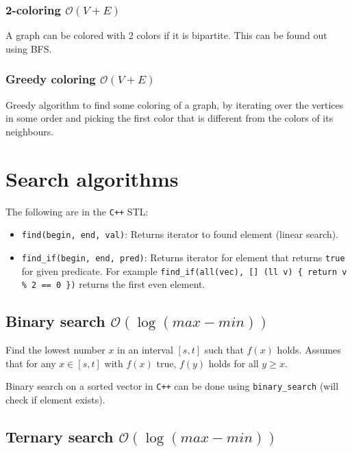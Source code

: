 \subsubsection{2-coloring $\mathcal O(V + E)$}
A graph can be colored with 2 colors if it is bipartite. This can be found out using BFS.

\subsubsection{Greedy coloring $\mathcal O(V + E)$}
Greedy algorithm to find some coloring of a graph, by iterating over the vertices in some order and picking the first color that is different from the colors of its neighbours.





\section{Search algorithms}
The following are in the \texttt{C++} STL:
\begin{itemize}
    \item \texttt{find(begin, end, val)}: Returns iterator to found element (linear search).
    \item \texttt{find\_if(begin, end, pred)}: Returns iterator for element that returns \texttt{true} for given predicate. For example \texttt{find\_if(all(vec), [] (ll v) \{ return v \% 2 == 0 \})} returns the first even element.
\end{itemize}

\subsection{Binary search $\mathcal O(\log(max - min))$}

Find the lowest number $x$ in an interval $[s, t]$ such that $f(x)$ holds. Assumes that for any $x \in [s, t]$ with $f(x)$ true, $f(y)$ holds for all $y \geq x$.

Binary search on a sorted vector in \texttt{C++} can be done using \texttt{binary\_search} (will check if element exists).

\subsection{Ternary search $\mathcal O(\log(max - min))$}

